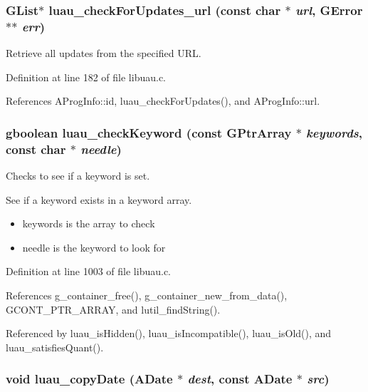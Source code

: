\subsubsection{\setlength{\rightskip}{0pt plus 5cm}GList$\ast$ luau\_\-check\-For\-Updates\_\-url (const char $\ast$ {\em url}, GError $\ast$$\ast$ {\em err})}\label{libuau_8c_a9}


Retrieve all updates from the specified URL. 



Definition at line 182 of file libuau.c.

References AProg\-Info::id, luau\_\-check\-For\-Updates(), and AProg\-Info::url.
\subsubsection{\setlength{\rightskip}{0pt plus 5cm}gboolean luau\_\-check\-Keyword (const GPtr\-Array $\ast$ {\em keywords}, const char $\ast$ {\em needle})}\label{libuau_8c_a33}


Checks to see if a keyword is set. 

See if a keyword exists in a keyword array.

\begin{itemize}
\item keywords is the array to check \item needle is the keyword to look for 
\end{itemize}


Definition at line 1003 of file libuau.c.

References g\_\-container\_\-free(), g\_\-container\_\-new\_\-from\_\-data(), GCONT\_\-PTR\_\-ARRAY, and lutil\_\-find\-String().

Referenced by luau\_\-is\-Hidden(), luau\_\-is\-Incompatible(), luau\_\-is\-Old(), and luau\_\-satisfies\-Quant().
\subsubsection{\setlength{\rightskip}{0pt plus 5cm}void luau\_\-copy\-Date ({\bf ADate} $\ast$ {\em dest}, const {\bf ADate} $\ast$ {\em src})}\label{libuau_8c_a47}


